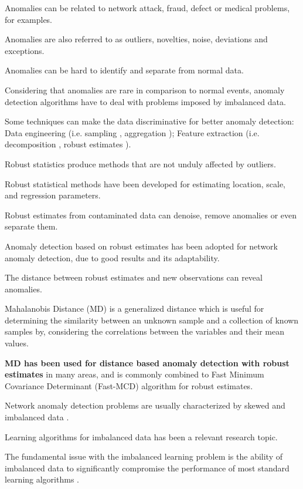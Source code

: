 \documentclass[review]{elsarticle}
\begin{document}
Anomalies can be related to network attack, fraud, defect or medical problems, for examples.

Anomalies are also referred to as outliers, novelties, noise, deviations and exceptions.

Anomalies can be hard to identify and separate from normal data.

Considering that anomalies are rare in comparison to normal events, anomaly detection algorithms have to deal with problems imposed by imbalanced data.

Some techniques can make the data discriminative for better anomaly detection: Data engineering (i.e. sampling \cite{??}, aggregation \cite{acarali2016survey}); Feature extraction (i.e. decomposition \cite{??}, robust estimates \cite{??}).

Robust statistics produce methods that are not unduly affected by outliers.

Robust statistical methods have been developed for estimating location, scale, and regression parameters.

Robust estimates from contaminated data can denoise, remove anomalies or even separate them.

Anomaly detection based on robust estimates has been adopted for network anomaly detection, due to good results and its adaptability.

The distance between robust estimates and new observations can reveal anomalies.

Mahalanobis Distance (MD) is a generalized distance which is useful for determining the similarity between an unknown sample and a collection of known samples by, considering the correlations between the variables and their mean values.

\textbf{MD has been used for distance based anomaly detection with robust estimates} in many areas, and is commonly combined to Fast Minimum Covariance Determinant (Fast-MCD) algorithm \cite{rousseeuw1999fast} for robust estimates.

Network anomaly detection problems are usually characterized by skewed and imbalanced data \cite{Phua2004minority}.

Learning algorithms for imbalanced data has been a relevant research topic. 

The fundamental issue with the imbalanced learning problem is the ability of imbalanced data to significantly compromise the performance of most standard learning algorithms \cite{he2008learning}.
\end{document}

